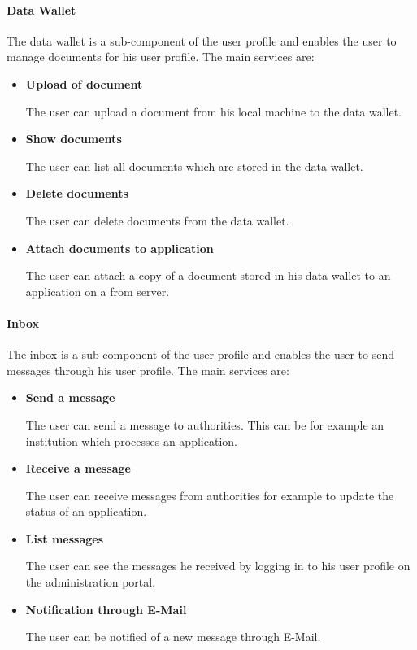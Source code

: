 \documentclass[
     12pt,         %
     a4paper,      %
     BCOR=10mm,version=first,     %
     DIV=14,version=first,        %
     ]{scrreprt}
\begin{document}
\paragraph{Data Wallet}
The data wallet is a sub-component of the user profile and enables the user to manage documents for his user profile. The main services are:

\begin{itemize}

    \item \textbf{Upload of document}
    
    The user can upload a document from his local machine to the data wallet.
    
    \item \textbf{Show documents}
    
    The user can list all documents which are stored in the data wallet.
    
    \item \textbf{Delete documents}
    
    The user can delete documents from the data wallet.
    
    \item \textbf{Attach documents to application}
    
    The user can attach a copy of a document stored in his data wallet to an application on a from server.

\end{itemize}

\paragraph{Inbox}
The inbox is a sub-component of the user profile and enables the user to send messages through his user profile. The main services are:
    
\begin{itemize}
    
    \item \textbf{Send a message}
    
    The user can send a message to authorities. This can be for example an institution which processes an application.
    
    \item \textbf{Receive a message}
    
    The user can receive messages from authorities for example to update the status of an application.
    
    \item \textbf{List messages}
    
    The user can see the messages he received by logging in to his user profile on the administration portal.
    
    \item \textbf{Notification through E-Mail}
    
    The user can be notified of a new message through E-Mail.

\end{itemize}
\end{document}
